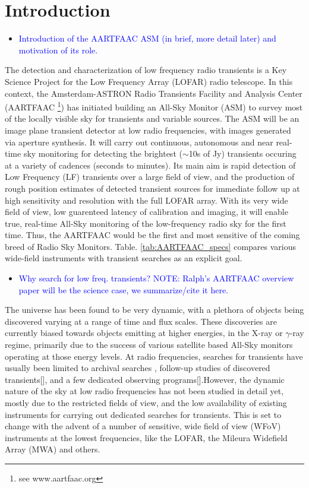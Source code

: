 \documentclass{aa}
\begin{document}
\section{\label{sec:Introduction}Introduction}
\begin{itemize}
\item \textcolor{blue}{Introduction of the AARTFAAC ASM (in brief, more
detail later) and motivation of its role.}
\end{itemize}
The detection and characterization of low frequency radio transients
is a Key Science Project \cite{fender2006lofar} for the Low Frequency
Array (LOFAR)\cite{vanhaarlem2013lofar} radio telescope. In this
context, the Amsterdam-ASTRON Radio Transients Facility and Analysis
Center (AARTFAAC%
\footnote{see www.aartfaac.org%
}) has initiated building an All-Sky Monitor (ASM) to survey most of
the locally visible sky for transients and variable sources. The ASM
will be an image plane transient detector at low radio frequencies,
with images generated via aperture synthesis. It will carry out continuous,
autonomous and near real-time sky monitoring for detecting the brightest
($\sim$10s of Jy) transients occuring at a variety of cadences (seconds
to minutes). Its main aim is rapid detection of Low Frequency (LF)
transients over a large field of view, and the production of rough
position estimates of detected transient sources for immediate follow
up at high sensitivity and resolution with the full LOFAR array. With
its very wide field of view, low guarenteed latency of calibration
and imaging, it will enable true, real-time All-Sky monitoring of
the low-frequency radio sky for the first time. Thus, the AARTFAAC
would be the first and most sensitive of the coming breed of Radio
Sky Monitors. Table. \ref{tab:AARTFAAC_specs} compares various wide-field
instruments with transient searches as an explicit goal.
\begin{itemize}
\item \textcolor{blue}{Why search for low freq. transients? NOTE: Ralph's
AARTFAAC overview paper will be the science case, we summarize/cite
it here.}
\end{itemize}
The universe has been found to be very dynamic, with a plethora of
objects being discovered varying at a range of time and flux scales.
These discoveries are currently biased towards objects emitting at
higher energies, in the X-ray or $\gamma$-ray regime, primarily due
to the success of various satellite based All-Sky monitors operating
at those energy levels. At radio frequencies, searches for transients
have usually been limited to archival searches \cite{bower2007submillijansky,bower2011search},
follow-up studies of discovered transients{[}{]}, and a few dedicated
observing programs{[}{]}.However, the dynamic nature of the sky at
low radio frequencies has not been studied in detail yet, mostly due
to the restricted fields of view, and the low availability of existing
instruments for carrying out dedicated searches for transients. This
is set to change with the advent of a number of sensitive, wide field
of view (WFoV) instruments at the lowest frequencies, like the LOFAR,
the Mileura Widefield Array (MWA) \cite{lonsdale2009murchison}and
others. 
\end{document}

